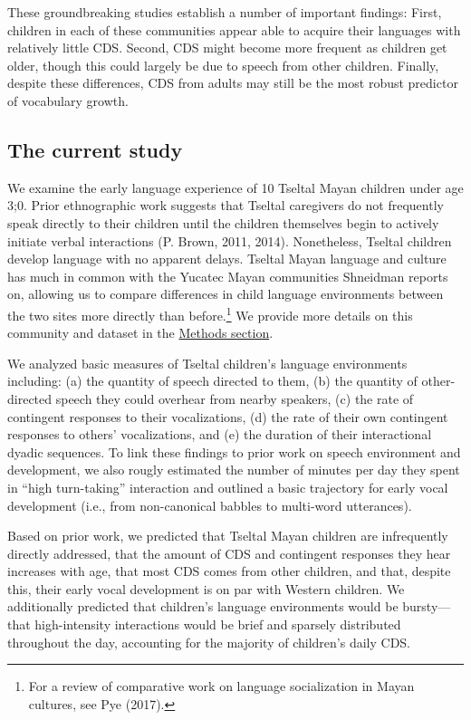 \documentclass[floatsintext,man]{apa6}
\theoremstyle{definition}
\theoremstyle{definition}
\theoremstyle{definition}
\theoremstyle{remark}
\begin{document}
These groundbreaking studies establish a number of important findings:
First, children in each of these communities appear able to acquire
their languages with relatively little CDS. Second, CDS might become
more frequent as children get older, though this could largely be due to
speech from other children. Finally, despite these differences, CDS from
adults may still be the most robust predictor of vocabulary growth.

\subsection{The current study}\label{intro-currentstudy}

We examine the early language experience of 10 Tseltal Mayan children
under age 3;0. Prior ethnographic work suggests that Tseltal caregivers
do not frequently speak directly to their children until the children
themselves begin to actively initiate verbal interactions (P. Brown,
2011, 2014). Nonetheless, Tseltal children develop language with no
apparent delays. Tseltal Mayan language and culture has much in common
with the Yucatec Mayan communities Shneidman reports on, allowing us to
compare differences in child language environments between the two sites
more directly than before.\footnote{For a review of comparative work on
  language socialization in Mayan cultures, see Pye (2017).} We provide
more details on this community and dataset in the
\protect\hyperlink{methods}{Methods section}.

We analyzed basic measures of Tseltal children's language environments
including: (a) the quantity of speech directed to them, (b) the quantity
of other-directed speech they could overhear from nearby speakers, (c)
the rate of contingent responses to their vocalizations, (d) the rate of
their own contingent responses to others' vocalizations, and (e) the
duration of their interactional dyadic sequences. To link these findings
to prior work on speech environment and development, we also rougly
estimated the number of minutes per day they spent in \enquote{high
turn-taking} interaction and outlined a basic trajectory for early vocal
development (i.e., from non-canonical babbles to multi-word utterances).

Based on prior work, we predicted that Tseltal Mayan children are
infrequently directly addressed, that the amount of CDS and contingent
responses they hear increases with age, that most CDS comes from other
children, and that, despite this, their early vocal development is on
par with Western children. We additionally predicted that children's
language environments would be bursty---that high-intensity interactions
would be brief and sparsely distributed throughout the day, accounting
for the majority of children's daily CDS.
\end{document}

